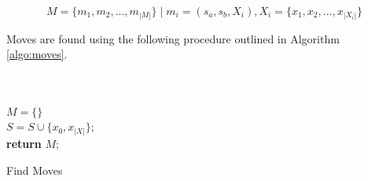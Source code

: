 \begin{equation}
\label{eq:feature-moves}
M = \{m_1, m_2, ..., m_{|M|}\} \;| \; m_i = (s_a, s_b, X_i), X_i = \{x_1, x_2, ..., x_{|X_i|}\}
\end{equation}

Moves are found using the following procedure outlined in Algorithm \ref{algo:moves}.

\begin{algorithm}[H]
\SetAlgoLined
{}\\
\\
    $M = \{ \}$\;\\
    $S = S \cup \{x_0, x_|X|\}$;\\
    \textbf{return} $M$;
 \label{algo:moves}
 \caption{Find Moves}
\end{algorithm}


